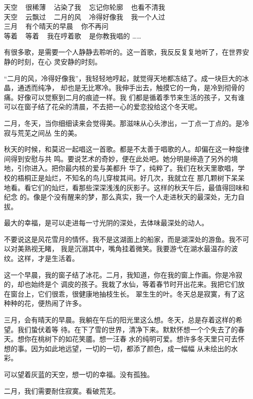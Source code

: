		\longpoem{}{}{}
			天空 ~ 很稀薄 ~ 沾染了我 ~ 忘记你轮廓 ~ 也看不清我 \\
			天空 ~ 云飘过 ~ 二月的风 ~ 冷得好像我 ~ 我一个人过 \\
			三月 ~ 有个晴天的早晨 ~ 你不再问 \\
			等着 ~ 等着 ~ 我在哼着歌 ~ 是你教我唱的 ……
		\endlongpoem

		有很多歌，是需要一个人静静去聆听的。这一首歌，我反反复复地听了，在世界安静的时刻，在心
	灵安静的时刻。

		“二月的风，冷得好像我”，我轻轻地哼起，就觉得天地都冻结了。成一块巨大的冰晶，通透而纯净，
	却也是无比寒冷。我伸手出去，触摸它的一角，是冷到彻骨的痛。好像可以觉察到二月的痕迹一样。我
	们都是循着季节来生活的孩子，又有谁可以在窗子结了花朵的清晨，不去把一心的爱恋投给这个冬天呢。

		二月，冬天，当你细细读来会觉得美。那滋味从心头渗出，一丁点一丁点的。是冷寂与荒芜之间丛
	生的美。

		秋天的时候，和莫迟一起唱这一首歌。都是不太善于唱歌的人。却偏在这一种旋律间得到安慰与共
	鸣。要说艺术的奇妙，便在此处吧。她分明是缔造了另外的境地，引你进入。把你最内核的爱与美都升
	华了，纯粹了。我们在秋天里歌唱，学校的梧桐正是灿烂，不知名的鸟儿穿梭其间。好几次，我就立在
	那几颗树下呆呆地看。看它们的灿烂，看那些深深浅浅的灰影子。这样的秋天午后，最值得回味和纪念
	的。像是个没有醒来的梦，那么真实，我一个人走进秋天的最深处，无力自拔。

		最大的幸福，是可以走进每一寸光阴的深处，去体味最深处的动人。

		不要说这是风花雪月的情怀。我不是这湖面上的船家，而是湖深处的游鱼。我不可以对美熟视无睹，
	我是沉溺其中，嘴角挂着微笑。我要游弋在湖水最温存的波纹。这样，才是生活着。

		这一个早晨，我的窗子结了冰花。二月，我知道，你在我的窗上作画。你是冷寂的，却也始终是个
	调皮的孩子。我栽了水仙，等着春节时开出花来。我把它们放在窗台上，它们很乖，很健康地抽枝生长。
	翠生生的叶。冬天总是寂寞，有了这种种的花，便热闹了许多。

		三月，会有晴天的早晨。我躺在午后的阳光里这么想。冬天，总是存着这样的希望。我们蛰伏着等
	待。在下了雪的世界，清净下来。默默怀想一个个失去了的春天。想你在桃树下的如花笑靥。想一汪春
	水的纯明可爱。想许多冬天里只可去怀想的事。因为如此地远望，一切的一切，都添了颜色，成一幅幅
	从未绘出的水彩。

		可以望着灰蓝的天空，想一切的幸福。没有孤独。

		二月，我们需要耐住寂寞。看破荒芜。

	\endwriting


